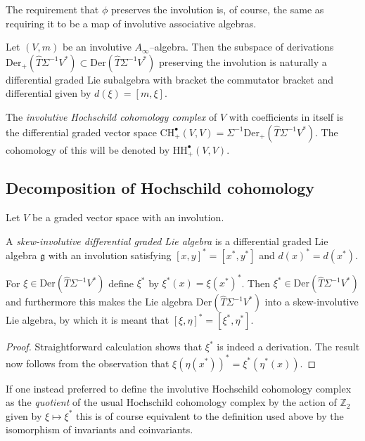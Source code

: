 \documentclass[british]{amsart}
\theoremstyle{plain}
\theoremstyle{definition}
{
\newaliascnt{{definition}}{theorem}\newtheorem{{definition}}[{definition}]{{Definition}}\aliascntresetthe{{definition}}\expandafterautorefname\endcsname{{Definition}}}
{
\newaliascnt{{remark}}{theorem}\newtheorem{{remark}}[{remark}]{{Remark}}\aliascntresetthe{{remark}}\expandafterautorefname\endcsname{{Remark}}}
{
\newaliascnt{{example}}{theorem}\newtheorem{{example}}[{example}]{{Example}}\aliascntresetthe{{example}}\expandafterautorefname\endcsname{{Example}}}
{
\newaliascnt{{examples}}{theorem}\newtheorem{{examples}}[{examples}]{{Examples}}\aliascntresetthe{{examples}}\expandafterautorefname\endcsname{{Examples}}}
{
\newaliascnt{{notation}}{theorem}\newtheorem{{notation}}[{notation}]{{Notation}}\aliascntresetthe{{notation}}\expandafterautorefname\endcsname{{Notation}}}
{
\newaliascnt{{convention}}{theorem}\newtheorem{{convention}}[{convention}]{{Convention}}\aliascntresetthe{{convention}}\expandafterautorefname\endcsname{{Convention}}}
\numberwithin{equation}{section}
\numberwithin{figure}{section}
\begin{document}
The requirement that $\phi$ preserves the involution is, of course, the same as requiring it to be a map of involutive associative algebras.

\begin{definition}
Let $(V,m)$ be an involutive $A_\infty$--algebra. Then the subspace of derivations ${\mathrm{Der}}_+(\widehat{T}\Sigma^{-1}V^*)\subset {\mathrm{Der}}(\widehat{T}\Sigma^{-1}V^*)$ preserving the involution is naturally a differential graded Lie subalgebra with bracket the commutator bracket and differential given by $d(\xi)=[m,\xi]$.

The \emph{involutive Hochschild cohomology complex} of $V$ with coefficients in itself is the differential graded vector space ${\mathrm{CH}}^{\bullet}_+(V,V) = \Sigma^{-1}{\mathrm{Der}}_+(\widehat{T}\Sigma^{-1}V^*)$. The cohomology of this will be denoted by ${\mathrm{HH}}^{\bullet}_+(V,V)$.
\end{definition}

\subsection{Decomposition of Hochschild cohomology}
Let $V$ be a graded vector space with an involution.

\begin{definition}\label{def:skewinvlie}
A \emph{skew-involutive differential graded Lie algebra} is a differential graded Lie algebra $\mathfrak{g}$ with an involution satisfying $[x,y]^* = [x^*,y^*]$ and $d(x)^* = d(x^*)$.
\end{definition}

\begin{proposition}
For $\xi\in{\mathrm{Der}}(\widehat{T}\Sigma^{-1}V^*)$ define $\xi^*$ by $\xi^*(x) = \xi(x^*)^*$. Then $\xi^*\in{\mathrm{Der}}(\widehat{T}\Sigma^{-1}V^*)$ and furthermore this makes the Lie algebra ${\mathrm{Der}}(\widehat{T}\Sigma^{-1}V^*)$ into a skew-involutive Lie algebra, by which it is meant that $[\xi,\eta]^* = [\xi^*,\eta^*]$.
\end{proposition}

\begin{proof}
Straightforward calculation shows that $\xi^*$ is indeed a derivation. The result now follows from the observation that $\xi(\eta(x^*))^* = \xi^*(\eta^*(x))$.
\end{proof}

\begin{remark}
If one instead preferred to define the involutive Hochschild cohomology complex as the \emph{quotient} of the usual Hochschild cohomology complex by the action of $\mathbb{Z}_2$ given by $\xi\mapsto \xi^*$ this is of course equivalent to the definition used above by the isomorphism of invariants and coinvariants.
\end{remark}
\end{document}

